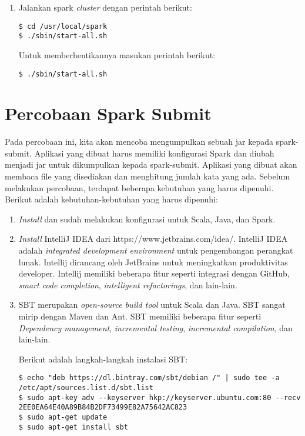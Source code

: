 \begin{enumerate}
\item Jalankan spark \textit{cluster} dengan perintah berikut:

\begin{verbatim}
$ cd /usr/local/spark
$ ./sbin/start-all.sh
\end{verbatim}
Untuk memberhentikannya masukan perintah berikut:
\begin{verbatim}
$ ./sbin/start-all.sh
\end{verbatim}


\end{enumerate}

\section{Percobaan Spark Submit}

Pada percobaan ini, kita akan mencoba mengumpulkan sebuah jar kepada spark-submit. Aplikasi yang dibuat harus memiliki konfigurasi Spark dan diubah menjadi jar untuk dikumpulkan kepada spark-submit. Aplikasi yang dibuat akan membaca file yang disediakan dan menghitung jumlah kata yang ada. Sebelum melakukan percobaan, terdapat beberapa kebutuhan yang harus dipenuhi. Berikut adalah kebutuhan-kebutuhan yang harus dipenuhi:

\begin{enumerate}

\item \textit{Install} dan sudah melakukan konfigurasi untuk Scala, Java, dan Spark.

\item \textit{Install} IntelliJ IDEA dari https://www.jetbrains.com/idea/. IntelliJ IDEA adalah \textit{integrated development environment} untuk pengembangan perangkat lunak. Intellij dirancang oleh JetBrains untuk meningkatkan produktivitas developer. Intellij memiliki beberapa fitur seperti integrasi dengan GitHub, \textit{smart code completion}, \textit{intelligent refactorings}, dan lain-lain.

\item SBT merupakan \textit{ open-source build tool} untuk Scala dan Java. SBT sangat mirip dengan Maven dan Ant. SBT memiliki beberapa fitur seperti \textit{Dependency management}, \textit{incremental testing},  \textit{incremental compilation},  dan lain-lain.

Berikut adalah langkah-langkah instalasi SBT:

\begin{verbatim}
$ echo "deb https://dl.bintray.com/sbt/debian /" | sudo tee -a /etc/apt/sources.list.d/sbt.list
$ sudo apt-key adv --keyserver hkp://keyserver.ubuntu.com:80 --recv 2EE0EA64E40A89B84B2DF73499E82A75642AC823
$ sudo apt-get update
$ sudo apt-get install sbt
\end{verbatim}


\end{enumerate}

